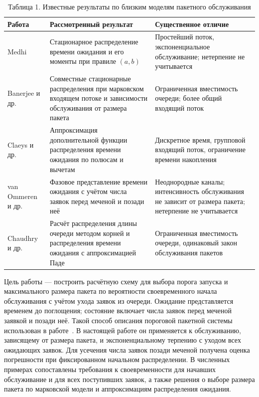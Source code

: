 \begin{table}[htbp]
\centering\small
\caption{Таблица 1. Известные результаты по близким моделям пакетного обслуживания}
\begin{tabular}{p{.22\linewidth}p{.36\linewidth}p{.34\linewidth}}
\hline
Работа & Рассмотренный результат & Существенное отличие \\\hline
Medhi~\cite{medhi1975} & Стационарное распределение времени ожидания и его моменты при правиле $(a,b)$ & Простейший поток, экспоненциальное обслуживание; нетерпение не учитывается \\
Banerjee и др.~\cite{banerjee2015} & Совместные стационарные распределения при марковском входящем потоке и зависимости обслуживания от размера пакета & Ограниченная вместимость очереди; более общий входящий поток \\
Claeys и др.~\cite{claeys2013} & Аппроксимация дополнительной функции распределения времени ожидания по полюсам и вычетам & Дискретное время, групповой входящий поток, ограничение времени накопления \\
van Ommeren и др.~\cite{vanommer2020} & Фазовое представление времени ожидания с учётом числа заявок перед меченой и позади неё & Неоднородные каналы; интенсивность обслуживания не зависит от размера пакета; нетерпение не учитывается \\
Chaudhry и др.~\cite{chaudhry2023} & Расчёт распределения длины очереди методом корней и распределения времени ожидания с аппроксимацией Паде & Ограниченная вместимость очереди, одинаковый закон обслуживания пакетов \\
\hline
\end{tabular}
\end{table}

Цель работы --- построить расчётную схему для выбора порога запуска и максимального размера пакета по вероятности своевременного начала обслуживания с учётом ухода заявок из очереди. Ожидание представляется временем до поглощения; состояние включает числа заявок перед меченой заявкой и позади неё. Такой способ описания пороговой пакетной системы использован в работе~\cite{vanommer2020}. В настоящей работе он применяется к обслуживанию, зависящему от размера пакета, и экспоненциальному терпению с уходом всех ожидающих заявок. Для усечения числа заявок позади меченой получена оценка погрешности при фиксированном начальном распределении. В численных примерах сопоставлены требования к своевременности для начавших обслуживание и для всех поступивших заявок, а также решения о выборе размера пакета по марковской модели и аппроксимациям распределения ожидания.

